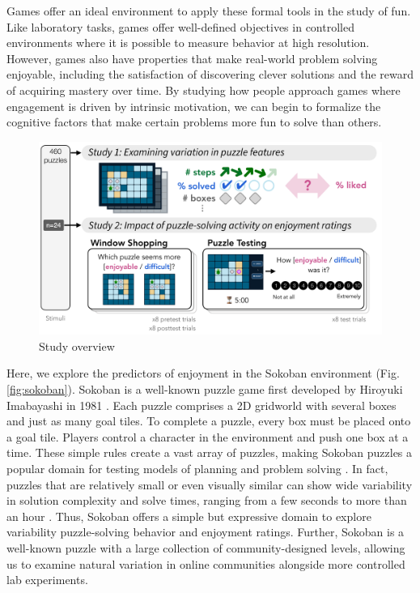 \documentclass[10pt,letterpaper]{article}
\begin{document}
Games offer an ideal environment to apply these formal tools in the study of fun. 
Like laboratory tasks, games offer well-defined objectives in controlled environments where it is possible to measure behavior at high resolution. 
However, games also have properties that make real-world problem solving enjoyable, including the satisfaction of discovering clever solutions and the reward of acquiring mastery over time.
By studying how people approach games where engagement is driven by intrinsic motivation, we can begin to formalize the cognitive factors that make certain problems more fun to solve than others. 


\begin{figure}[ht!]
    \centering
    \includegraphics[width=0.7\linewidth]{figures/fig2.pdf}
        \caption{Study overview}
        \label{fig:methods}        
\end{figure}


Here, we explore the predictors of enjoyment in the Sokoban environment (Fig. \ref{fig:sokoban}).
Sokoban is a well-known puzzle game first developed by Hiroyuki Imabayashi in 1981 \cite{sokobanwiki}.
Each puzzle comprises a 2D gridworld with several boxes and just as many goal tiles. To complete a puzzle, every box must be placed onto a goal tile. Players control a character in the environment and push one box at a time. These simple rules create a vast array of puzzles, making Sokoban puzzles a popular domain for testing models of planning and problem solving \cite{jaruvsek2010human,racaniere2017imagination,schaa2024predicting}. 
In fact, puzzles that are relatively small or even visually similar can show wide variability in solution complexity and solve times, ranging from a few seconds to more than an hour \cite{jaruvsek2010human}. 
Thus, Sokoban offers a simple but expressive domain to explore variability puzzle-solving behavior and enjoyment ratings. Further, Sokoban is a well-known puzzle with a large collection of community-designed levels, allowing us to examine natural variation in online communities alongside more controlled lab experiments.
\end{document}
